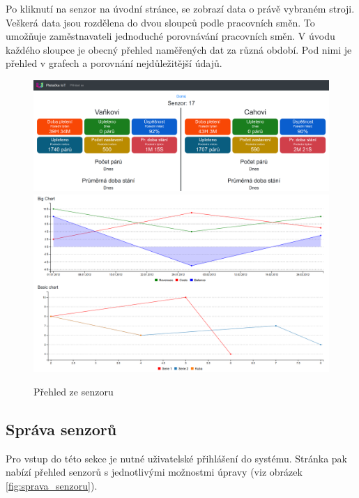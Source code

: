 Po kliknutí na senzor na úvodní stránce, se zobrazí data o právě vybraném stroji.
Veškerá data jsou rozdělena do dvou sloupců podle pracovních směn.
To umožňuje zaměstnavateli jednoduché porovnávání pracovních směn.
V úvodu každého sloupce je obecný přehled naměřených dat za různá období.
Pod nimi je přehled v grafech a porovnání nejdůležitější údajů.

\begin{figure}[htbp]
    \centering
    \includegraphics[width=\textwidth]{img/Senzor.png}
    \includegraphics[width=\textwidth]{img/Graf.png}
    \caption{Přehled ze senzoru}
    \label{fig:databaze}
\end{figure}


\fxnote[author=JPA]{\textcolor{mygreen}{Aktualizovat grafy/obrázky}}


\subsection{Správa senzorů}
Pro vstup do této sekce je nutné uživatelské přihlášení do systému.
Stránka pak nabízí přehled senzorů s jednotlivými možnostmi úpravy (viz obrázek \ref{fig:sprava_senzoru}).


